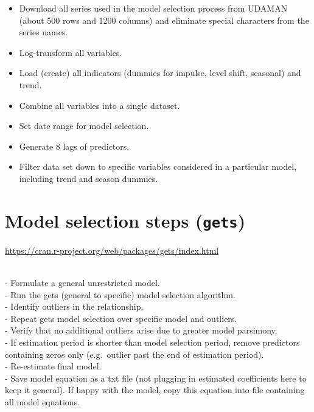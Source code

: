 \documentclass[
  letterpaper,
  DIV=11,
  numbers=noendperiod]{scrreport}
\providecommand{\tightlist}{%
  \setlength{\itemsep}{0pt}\setlength{\parskip}{0pt}}\usepackage{longtable,booktabs,array}
\begin{document}
\begin{itemize}
\tightlist
\item
  Download all series used in the model selection process from UDAMAN
  (about 500 rows and 1200 columns) and eliminate special characters
  from the series names.\\
\item
  Log-transform all variables.\\
\item
  Load (create) all indicators (dummies for impulse, level shift,
  seasonal) and trend.\\
\item
  Combine all variables into a single dataset.\\
\item
  Set date range for model selection.\\
\item
  Generate 8 lags of predictors.\\
\item
  Filter data set down to specific variables considered in a particular
  model, including trend and season dummies.
\end{itemize}

\section{\texorpdfstring{Model selection steps
(\texttt{gets})}{Model selection steps (gets)}}\label{model-selection-steps-gets}

\url{https://cran.r-project.org/web/packages/gets/index.html}\strut \\
- Formulate a general unrestricted model.\\
- Run the gets (general to specific) model selection algorithm.\\
- Identify outliers in the relationship.\\
- Repeat gets model selection over specific model and outliers.\\
- Verify that no additional outliers arise due to greater model
parsimony.\\
- If estimation period is shorter than model selection period, remove
predictors containing zeros only (e.g.~outlier past the end of
estimation period).\\
- Re-estimate final model.\\
- Save model equation as a txt file (not plugging in estimated
coefficients here to keep it general). If happy with the model, copy
this equation into file containing all model equations.
\end{document}
